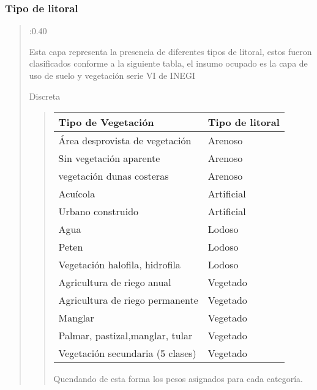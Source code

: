 \documentclass[letterpaper,10pt,spanish]{sphinxmanual}
\begin{document}
\subsubsection{Tipo de litoral}
\label{\detokenize{resiliencia:tipo-de-litoral}}
\begin{quote}

:0.40


 Esta capa representa la presencia de diferentes tipos de litoral, estos fueron clasificados
conforme a la siguiente tabla, el insumo ocupado es la capa de uso de suelo y vegetación
serie VI de INEGI

 Discreta
\begin{quote}


\begin{savenotes}\sphinxattablestart
\centering
\begin{tabulary}{\linewidth}[t]{|T|T|}
\hline
\sphinxstyletheadfamily 
Tipo de Vegetación
&\sphinxstyletheadfamily 
Tipo de litoral
\\
\hline
Área desprovista de vegetación
&
Arenoso
\\
\hline
Sin vegetación aparente
&
Arenoso
\\
\hline
vegetación dunas costeras
&
Arenoso
\\
\hline
Acuícola
&
Artificial
\\
\hline
Urbano construido
&
Artificial
\\
\hline
Agua
&
Lodoso
\\
\hline
Peten
&
Lodoso
\\
\hline
Vegetación halofila, hidrofila
&
Lodoso
\\
\hline
Agricultura de riego anual
&
Vegetado
\\
\hline
Agricultura de riego permanente
&
Vegetado
\\
\hline
Manglar
&
Vegetado
\\
\hline
Palmar, pastizal,manglar, tular
&
Vegetado
\\
\hline
Vegetación secundaria (5 clases)
&
Vegetado
\\
\hline
\end{tabulary}
\par
\sphinxattableend\end{savenotes}

Quendando de esta forma los pesos asignados para cada categoría.



\end{quote}
\end{quote}
\end{document}
